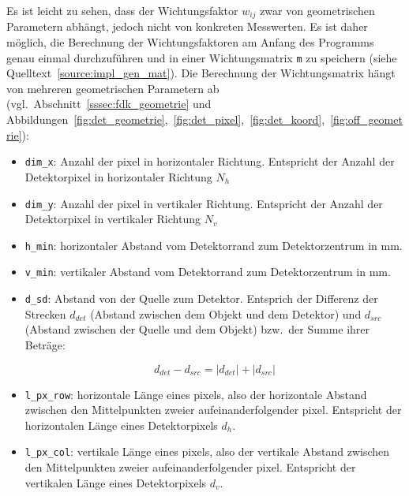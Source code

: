 Es ist leicht zu sehen, dass der Wichtungsfaktor $w_{ij}$ zwar von geometrischen Parametern abhängt, jedoch nicht von
konkreten Messwerten. Es ist daher möglich, die Berechnung der Wichtungsfaktoren am Anfang des Programms genau einmal
durchzuführen und in einer Wichtungsmatrix \texttt{m} zu speichern (siehe Quelltext~\ref{source:impl_gen_mat}). Die
Berechnung der Wichtungsmatrix hängt von mehreren geometrischen Parametern ab (vgl.\
Abschnitt~\ref{sssec:fdk_geometrie} und
Abbildungen~\ref{fig:det_geometrie},~\ref{fig:det_pixel},~\ref{fig:det_koord},~\ref{fig:off_geometrie}):

\begin{itemize}
    \item \texttt{dim\_x}: Anzahl der \gls{pixel} in horizontaler Richtung. Entspricht der Anzahl der Detektorpixel in
          horizontaler Richtung $N_h$
    \item \texttt{dim\_y}: Anzahl der \gls{pixel} in vertikaler Richtung. Entspricht der Anzahl der Detektorpixel in
          vertikaler Richtung $N_v$
    \item \texttt{h\_min}: horizontaler Abstand vom Detektorrand zum Detektorzentrum in mm.
    \item \texttt{v\_min}: vertikaler Abstand vom Detektorrand zum Detektorzentrum in mm.
    \item \texttt{d\_sd}: Abstand von der Quelle zum Detektor. Entsprich der Differenz der Strecken $d_{det}$ (Abstand
          zwischen dem Objekt und dem Detektor) und $d_{src}$ (Abstand zwischen der Quelle und dem Objekt) bzw.\ der
          Summe ihrer Beträge:
          
          \begin{equation*}
              d_{det} - d_{src} = |d_{det}| + |d_{src}|
          \end{equation*}

    \item \texttt{l\_px\_row}: horizontale Länge eines \gls{pixel}s, also der horizontale Abstand zwischen den
          Mittelpunkten zweier aufeinanderfolgender \gls{pixel}. Entspricht der horizontalen Länge eines Detektorpixels
          $d_h$.
    \item \texttt{l\_px\_col}: vertikale Länge eines \gls{pixel}s, also der vertikale Abstand zwischen den
          Mittelpunkten zweier aufeinanderfolgender \gls{pixel}. Entspricht der vertikalen Länge eines Detektorpixels
          $d_v$.
\end{itemize}

